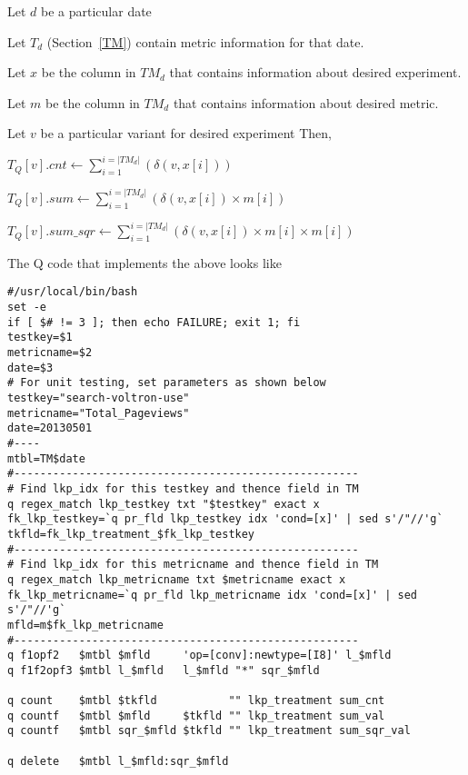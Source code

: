 \bi
\item Let \(d\) be a particular date 
\item Let \(T_d\) (Section~\ref{TM}) contain metric information for that date. 
\item Let \(x\) be the column in \(TM_d\) that contains information 
about desired experiment. 
\item Let \(m\) be the column in \(TM_d\) that contains information 
about desired metric. 
\item Let \(v\) be a particular variant for desired experiment
\ei
Then, 
\bi
\item \(T_Q[v].cnt \leftarrow \sum_{i=1}^{i=|TM_d|} 
( \delta(v, x[i])  ) \)
\item \(T_Q[v].sum \leftarrow \sum_{i=1}^{i=|TM_d|} 
( \delta(v, x[i]) \times m[i] ) \)
\item \(T_Q[v].sum\_sqr \leftarrow \sum_{i=1}^{i=|TM_d|} 
( \delta(v, x[i]) \times m[i] \times m[i] ) \)
  \ei

The Q code that implements the above looks like
\begin{verbatim}
#/usr/local/bin/bash
set -e 
if [ $# != 3 ]; then echo FAILURE; exit 1; fi
testkey=$1
metricname=$2
date=$3
# For unit testing, set parameters as shown below 
testkey="search-voltron-use"
metricname="Total_Pageviews"
date=20130501
#----
mtbl=TM$date
#-----------------------------------------------------
# Find lkp_idx for this testkey and thence field in TM
q regex_match lkp_testkey txt "$testkey" exact x
fk_lkp_testkey=`q pr_fld lkp_testkey idx 'cond=[x]' | sed s'/"//'g` 
tkfld=fk_lkp_treatment_$fk_lkp_testkey
#-----------------------------------------------------
# Find lkp_idx for this metricname and thence field in TM
q regex_match lkp_metricname txt $metricname exact x
fk_lkp_metricname=`q pr_fld lkp_metricname idx 'cond=[x]' | sed s'/"//'g`
mfld=m$fk_lkp_metricname
#-----------------------------------------------------
q f1opf2   $mtbl $mfld     'op=[conv]:newtype=[I8]' l_$mfld
q f1f2opf3 $mtbl l_$mfld   l_$mfld "*" sqr_$mfld

q count    $mtbl $tkfld           "" lkp_treatment sum_cnt
q countf   $mtbl $mfld     $tkfld "" lkp_treatment sum_val
q countf   $mtbl sqr_$mfld $tkfld "" lkp_treatment sum_sqr_val

q delete   $mtbl l_$mfld:sqr_$mfld
\end{verbatim}

% 

